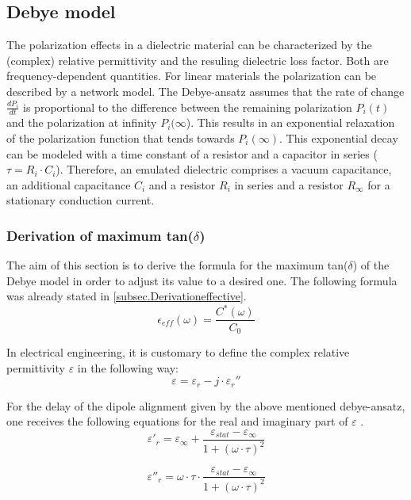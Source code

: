 \subsection{Debye model}
The polarization effects in a dielectric material can be characterized by the (complex) relative permittivity and the resuling dielectric loss factor. Both are frequency-dependent quantities. 
For linear materials the polarization can be described by a network model. The Debye-ansatz assumes that the rate of change $ \frac{dP_i}{dt}$ is proportional to the difference between the remaining polarization $P_i(t)$  and the polarization at infinity $P_i(\infty$). This results in an exponential relaxation of the polarization function that tends towards $P_i(\infty)$. This exponential decay can be modeled with a time constant of a resistor and a capacitor in series ($\tau=R_i \cdot C_i$). Therefore, an emulated dielectric comprises a vacuum capacitance, an additional capacitance $C_i$ and a resistor $R_i$ in series and a resistor $R_{\infty}$ for a stationary conduction current. 

\subsubsection{Derivation of maximum tan($\delta$)}
The aim of this section is to derive the formula for the maximum tan($\delta$) of the Debye model in order to adjust its value to a desired one. The following formula was already stated in \ref{subsec.Derivationeffective}.
\begin{equation}
\epsilon_{eff} (\omega) = \frac{C^*(\omega)}{C_0}
\end{equation}

In electrical engineering, it is customary to define the  complex relative permittivity $\varepsilon$ in the following way: 
\begin{equation}
\varepsilon  = \varepsilon_r-j \cdot \varepsilon_r''
\end{equation}

For the delay of the dipole alignment given by the above mentioned debye-ansatz, one receives the following equations for the real and imaginary part of $\varepsilon$ \cite{Kuchler}. 
\begin{equation}
\varepsilon'_r = \varepsilon_{\infty} + \frac{\varepsilon_{stat}-\varepsilon_{\infty}}{1+(\omega \cdot \tau )^2}
\end{equation}

\begin{equation}
\varepsilon''_r = \omega \cdot \tau \cdot \frac{\varepsilon_{stat}-\varepsilon_{\infty}}{1+(\omega \cdot \tau )^2}
\end{equation}

